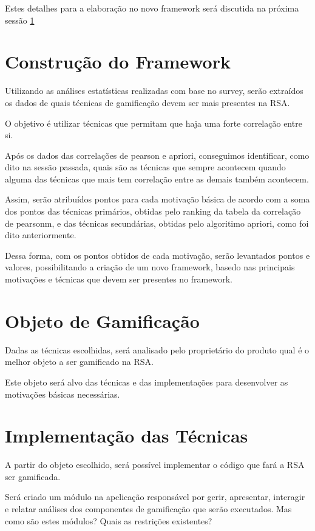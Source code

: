 Estes detalhes para a elaboração no novo framework será discutida na próxima sessão \ref{sub:constru_o_do_framework}

\section{Construção do Framework}
\label{sub:constru_o_do_framework}
Utilizando as análises estatísticas realizadas com base no survey, serão extraídos os dados de quais técnicas de gamificação
devem ser mais presentes na RSA.

O objetivo é  utilizar técnicas que permitam que haja uma forte correlação entre si.

Após os dados das correlações de pearson e apriori, conseguimos identificar, como dito na sessão passada, quais são as técnicas
que sempre acontecem quando alguma das técnicas que mais tem correlação entre as demais também acontecem.

Assim, serão atribuídos pontos para cada motivação básica de acordo com a soma dos pontos das técnicas primários, obtidas pelo ranking da
tabela da correlação de pearsonm, e das técnicas secundárias, obtidas pelo algoritimo apriori, como foi dito anteriormente.

Dessa forma, com os pontos obtidos de cada motivação, serão levantados pontos e valores, possibilitando a criação de um novo framework,
basedo nas principais motivações e técnicas que devem ser presentes no framework.

\section{Objeto de Gamificação}
\label{sub:objeto_de_gamifica_o}
Dadas as técnicas escolhidas, será analisado pelo proprietário do produto qual é o melhor objeto a ser gamificado na RSA.

Este objeto será alvo das técnicas e das implementações para desenvolver as motivações básicas necessárias.


\section{Implementação das Técnicas}
\label{sub:implementa_o_das_t_cnicas}
A partir do objeto escolhido, será possível implementar o código que fará a RSA ser gamificada.

Será criado um módulo na apclicação responsável por gerir, apresentar, interagir e relatar análises
dos componentes de gamificação que serão executados. Mas como são estes módulos? Quais as restrições existentes?

